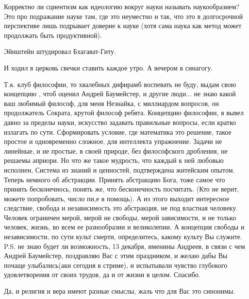 \begin{multicols}{2}
Корректно ли сциентизм как идеологию вокруг науки называть наукообразием? Это
про подражание науке там, где это неуместно и так, что это в долгосрочной
перспективе лишь подрывает доверие к науке (хотя сама наука как метод может
продолжать быть продуктивной).


Эйнштейн штудировал Бхагават-Гиту.

\begin{itemize} %
И ходил в церковь свечки ставить каждое утро. А вечером в синагогу.
\end{itemize} %


Т.к. клуб философии, то хвалебных дифирамб воспевать не буду, выдам свою
концепцию , чтоб оценил Андрей Баумейстер,  и другие люди... не знаю какой ваш
любимый философ, для меня Незнайка, с миллиардом вопросов, он продолжатель
Сократа, крутой философ ребята.  Концепцию философии, я вывел давно за пределы
науки, искусство задавать правильные вопросы, если кратко излагать по сути.
Сформировать условие, где математика это решение, такое простое и одновременно
сложное, для интеллекта упражнение. Задачи не линейные, и не простые, в своей
природе, без философского дробления, не решаемы априори. Но что же такое
мудрость, что каждый к ней любовью исполнен,  Система из знаний и ценностей,
подтверждена житейским опытом.  Теперь немного об абстракции. Принять
абстракцию Бога, тоже самое что принять бесконечнось, понять же, что
бесконечность посчитать. (Кто не верит, можете попробовать,  число пи,е  в
помощь). А из этого выходит интересное следствие, свобода и независимость это
абстракция, не под властная человеку. Человек ограничен мерой, мерой не
свободы, мерой зависимости, и не только человек, жизнь, во всем ее разнообразии
и великолепии. А концепция свободы и независимости, по сути культ смерти,
определитесь, какому культу Вы служите. P.S. не знаю будет ли возможность, 13
декабря, именины Андреев,  в связи с чем Андрей Баумейстер,  поздравляю Вас с
этим праздником, и желаю дабы Вы почаще улыбались(аки  сегодня в стриме), и
испытывали чувство глубокого удовлетворения от своих трудов, да и от жизни в
целом. Спасибо.

\begin{itemize} %
Да, и религия и вера имеют разные смыслы, жаль что для Вас это синонимы.
\end{itemize} %



\end{multicols}
